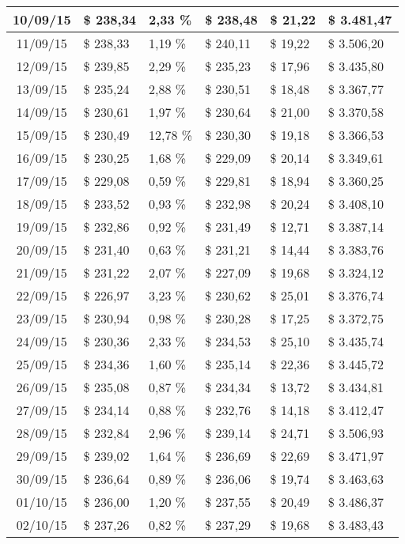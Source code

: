 \begin{small}
\begin{longtable}{|c|l|l|l|l|l|}
10/09/15 & \$ 238,34 & 2,33 \% & \$ 238,48 & \$ 21,22 & \$ 3.481,47 \\ \hline
11/09/15 & \$ 238,33 & 1,19 \% & \$ 240,11 & \$ 19,22 & \$ 3.506,20 \\ \hline
12/09/15 & \$ 239,85 & 2,29 \% & \$ 235,23 & \$ 17,96 & \$ 3.435,80 \\ \hline
13/09/15 & \$ 235,24 & 2,88 \% & \$ 230,51 & \$ 18,48 & \$ 3.367,77 \\ \hline
14/09/15 & \$ 230,61 & 1,97 \% & \$ 230,64 & \$ 21,00 & \$ 3.370,58 \\ \hline
15/09/15 & \$ 230,49 & 12,78 \% & \$ 230,30 & \$ 19,18 & \$ 3.366,53 \\ \hline
16/09/15 & \$ 230,25 & 1,68 \% & \$ 229,09 & \$ 20,14 & \$ 3.349,61 \\ \hline
17/09/15 & \$ 229,08 & 0,59 \% & \$ 229,81 & \$ 18,94 & \$ 3.360,25 \\ \hline
18/09/15 & \$ 233,52 & 0,93 \% & \$ 232,98 & \$ 20,24 & \$ 3.408,10 \\ \hline
19/09/15 & \$ 232,86 & 0,92 \% & \$ 231,49 & \$ 12,71 & \$ 3.387,14 \\ \hline
20/09/15 & \$ 231,40 & 0,63 \% & \$ 231,21 & \$ 14,44 & \$ 3.383,76 \\ \hline
21/09/15 & \$ 231,22 & 2,07 \% & \$ 227,09 & \$ 19,68 & \$ 3.324,12 \\ \hline
22/09/15 & \$ 226,97 & 3,23 \% & \$ 230,62 & \$ 25,01 & \$ 3.376,74 \\ \hline
23/09/15 & \$ 230,94 & 0,98 \% & \$ 230,28 & \$ 17,25 & \$ 3.372,75 \\ \hline
24/09/15 & \$ 230,36 & 2,33 \% & \$ 234,53 & \$ 25,10 & \$ 3.435,74 \\ \hline
25/09/15 & \$ 234,36 & 1,60 \% & \$ 235,14 & \$ 22,36 & \$ 3.445,72 \\ \hline
26/09/15 & \$ 235,08 & 0,87 \% & \$ 234,34 & \$ 13,72 & \$ 3.434,81 \\ \hline
27/09/15 & \$ 234,14 & 0,88 \% & \$ 232,76 & \$ 14,18 & \$ 3.412,47 \\ \hline
28/09/15 & \$ 232,84 & 2,96 \% & \$ 239,14 & \$ 24,71 & \$ 3.506,93 \\ \hline
29/09/15 & \$ 239,02 & 1,64 \% & \$ 236,69 & \$ 22,69 & \$ 3.471,97 \\ \hline
30/09/15 & \$ 236,64 & 0,89 \% & \$ 236,06 & \$ 19,74 & \$ 3.463,63 \\ \hline
01/10/15 & \$ 236,00 & 1,20 \% & \$ 237,55 & \$ 20,49 & \$ 3.486,37 \\ \hline
02/10/15 & \$ 237,26 & 0,82 \% & \$ 237,29 & \$ 19,68 & \$ 3.483,43 \\ \hline

\end{longtable}
\end{small}
